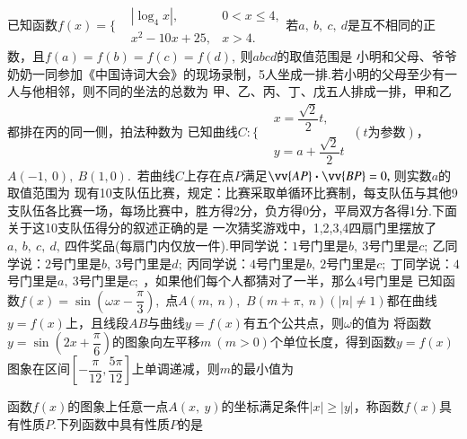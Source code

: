 \documentclass[marginline,noindent,answers,adobefonts]{BHCexam}
\newcommand{\xl}[2]{\vv{#1}\bm\cdot\vv{#2}}
\begin{document}
\begin{questions}
\qs 已知函数$f(x)=\Bigg\{\begin{aligned}
&\left|\log_4x\right|,&0<x\le 4,\\&x^2-10x+25,&x>4.
\end{aligned}$若$ a,~b,~c,~d $是互不相同的正数，且$ f(a)=f(b)=f(c)=f(d),~ $则$ abcd $的取值范围是\xx
{}
\qs 小明和父母、爷爷奶奶一同参加《中国诗词大会》的现场录制，5人坐成一排.若小明的父母至少有一人与他相邻，则不同的坐法的总数为\xx
{}
\qs 甲、乙、丙、丁、戊五人排成一排，甲和乙都排在丙的同一侧，拍法种数为\xx
{}
\qs 已知曲线$ C:\Bigg\{\begin{aligned}
&x=\dfrac{\sqrt{2}}{2}t,\\
&y=a+\dfrac{\sqrt{2}}{2}t
\end{aligned} ~(t\text{为参数})$，$ A(-1,~0),~B(1,0) $.~若曲线$ C $上存在点$ P $满足$ \xl{AP}{BP}=0,~$则实数$ a $的取值范围为\xx
{}
\qs 现有10支队伍比赛，规定：比赛采取单循环比赛制，每支队伍与其他9支队伍各比赛一场，每场比赛中，胜方得2分，负方得0分，平局双方各得1分.下面关于这10支队伍得分的叙述正确的是\xx
{} 
\qs 一次猜奖游戏中，1,2,3,4四扇门里摆放了$ a,~b,~c,~d,~ $四件奖品(每扇门内仅放一件).甲同学说：$1$号门里是$ b,~ $$3$号门里是$ c;~ $乙同学说：$2$号门里是$ b,~ $$3$号门里是$ d;~ $丙同学说：$4$号门里是$ b,~ $$2$号门里是$ c;~ $丁同学说：$4$号门里是$ a,~ $$3$号门里是$ c;~ $，如果他们每个人都猜对了一半，那么$4$号门里是\xx
{}
\qs 已知函数$f(x)=\sin (\omega x-\dfrac{\pi}{3})$,~点$ A(m,~n) $,~$ B(m+\pi,~n) (\left|n\right|\ne 1)$都在曲线$ y=f(x) $上，且线段$ AB $与曲线$ y=f(x) $有五个公共点，则$ \omega $的值为\xx
{}
\qs 将函数$ y=\sin (2x+\dfrac{\pi}{6}) $的图象向左平移$ m~(m>0) $个单位长度，得到函数$ y=f(x) $图象在区间$ \left[-\dfrac{\pi}{12},\dfrac{5\pi}{12}\right] $上单调递减，则$ m $的最小值为\xx
{}


\qs 函数$f(x)$的图象上任意一点$ A(x,~y) $的坐标满足条件$ \left|x\right|\ge\left|y\right| $，称函数$f(x)$具有性质$ P $.下列函数中具有性质$ P $的是\xx
{}


\end{questions}
\end{document}
